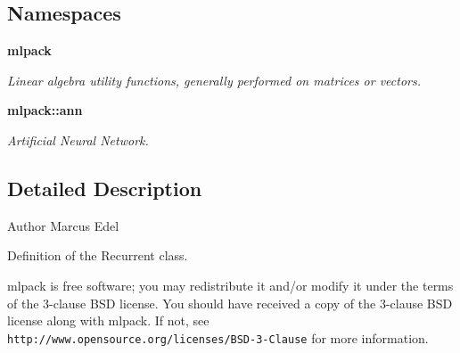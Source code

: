 \subsection*{Namespaces}
\begin{DoxyCompactItemize}
\item 
 \textbf{ mlpack}
\begin{DoxyCompactList}\small\item\em Linear algebra utility functions, generally performed on matrices or vectors. \end{DoxyCompactList}\item 
 \textbf{ mlpack\+::ann}
\begin{DoxyCompactList}\small\item\em Artificial Neural Network. \end{DoxyCompactList}\end{DoxyCompactItemize}


\subsection{Detailed Description}
\begin{DoxyAuthor}{Author}
Marcus Edel
\end{DoxyAuthor}
Definition of the Recurrent class.

mlpack is free software; you may redistribute it and/or modify it under the terms of the 3-\/clause B\+SD license. You should have received a copy of the 3-\/clause B\+SD license along with mlpack. If not, see {\tt http\+://www.\+opensource.\+org/licenses/\+B\+S\+D-\/3-\/\+Clause} for more information. 